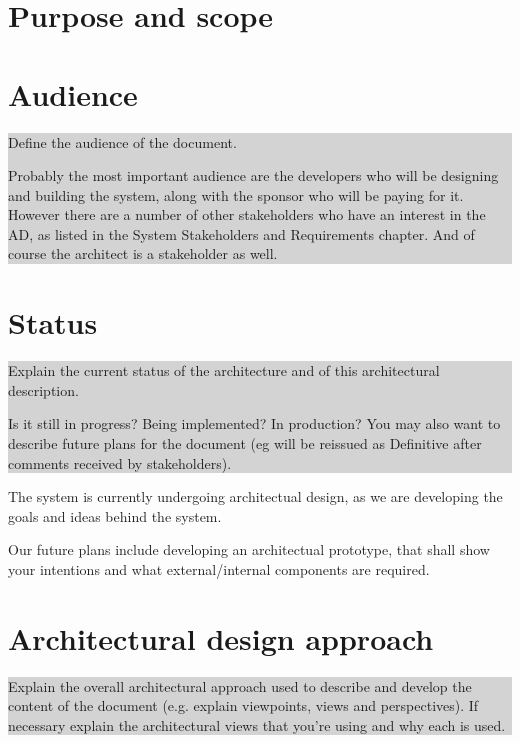 \documentclass[a4paper,11pt]{report}
\newcommand{\instructions}[1]{
  \noindent\colorbox{lightgray}{%
    \parbox{\linewidth}{%
      #1
    }%
  }%
 \vspace{0.1cm}
}
\begin{document}
\section{Purpose and scope}
\label{sec:purpose-scope}




\section{Audience}
\label{sec:audience}

\instructions{
  Define the audience of the document.

  Probably the most important audience are the developers who will be
  designing and building the system, along with the sponsor who will be
  paying for it. However there are a number of other stakeholders who
  have an interest in the AD, as listed in the System Stakeholders and
  Requirements chapter. And of course the architect is a stakeholder as
  well.
}

\section{Status}
\label{sec:status}

\instructions{

  Explain the current status of the architecture and of this
  architectural description.

  Is it still in progress? Being implemented? In production? You may
  also want to describe future plans for the document (eg will be
  reissued as Definitive after comments received by stakeholders).
}

The system is currently undergoing architectual design, as we are developing
the goals and ideas behind the system.

Our future plans include developing an architectual prototype, that shall show
your intentions and what external/internal components are required.

\section{Architectural design approach}
\label{sec:arch-design-appr}

\instructions{
  Explain the overall architectural approach used to describe and
  develop the content of the document (e.g. explain viewpoints, views
  and perspectives). If necessary explain the architectural views that
  you’re using and why each is used.
}
\end{document}
